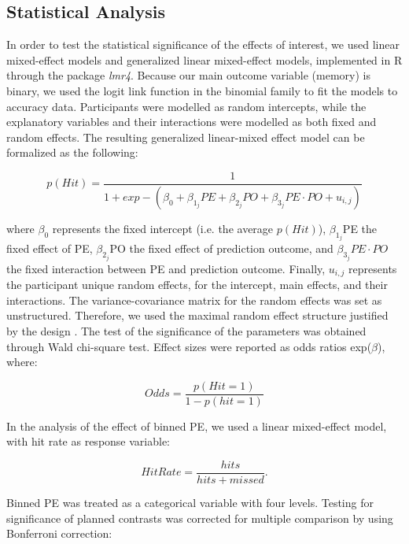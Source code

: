 \documentclass[a4paper,12pt]{article} 			%
\begin{document}
\subsection{Statistical Analysis}
In order to test the statistical significance of the effects of interest, we used linear mixed-effect models and generalized linear mixed-effect models, implemented in R through the package \textit{lmr4}. Because our main outcome variable (memory) is binary, we used the logit link function in the binomial family to fit the models to accuracy data. Participants were modelled as random intercepts, while the explanatory variables and their interactions were modelled as both fixed and random effects. The resulting generalized linear-mixed effect model can be formalized as the following:

\begin{equation}
p(Hit) =   \dfrac{1}{1+exp - (\beta_0 +\beta_{1_j} PE +\beta_{2_j} PO + \beta_{3_j} PE \cdot PO + u_{i,j} )}
\end{equation}

\noindent
where $\beta_0$ represents the fixed intercept (i.e. the average $p(Hit)$), $\beta_{1_j}$PE the fixed effect of PE,  $\beta_{2_j}$PO the fixed effect of prediction outcome, and $\beta_{3_j} PE \cdot PO$ the fixed interaction between PE and prediction outcome. Finally, $u_{i,j}$ represents the participant unique random effects, for the intercept, main effects, and their interactions.
The variance-covariance matrix for the random effects was set as unstructured. Therefore, we used the maximal random effect structure justified by the design \citep{barr2013random}. The test of the significance of the parameters was obtained through Wald chi-square test. Effect sizes were reported as odds ratios exp($\beta$), where:

\begin{equation}
Odds =   \dfrac{p(Hit=1)}{1-p(hit=1)}
\end{equation}

\noindent
In the analysis of the effect of binned PE, we used a linear mixed-effect model, with hit rate as response variable:

\begin{equation}
Hit Rate =   \dfrac{hits}{hits+missed}.
\end{equation}

\noindent
Binned PE was treated as a categorical variable with four levels. Testing for significance of planned contrasts was corrected for multiple comparison by using Bonferroni correction:
\end{document}
